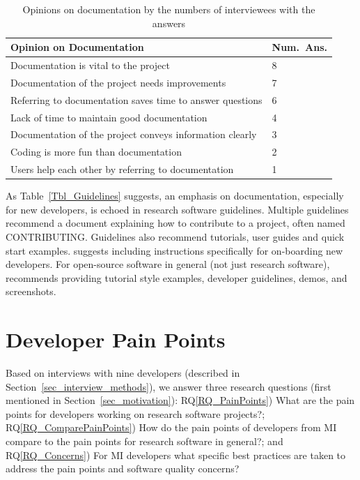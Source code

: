 \documentclass[final, 12pt, 3p, times]{elsarticle}
\newcommand{\rqref}[1]{RQ\ref{#1}}
\begin{document}
\begin{table}[!ht]
\centering
\begin{tabular}{ll}
\toprule
Opinion on Documentation & Num.\ Ans. \\ 
\midrule
Documentation is vital to the project & 8 \\
Documentation of the project needs improvements & 7 \\
Referring to documentation saves time to answer questions & 6 \\
Lack of time to maintain good documentation & 4 \\
Documentation of the project conveys information clearly & 3 \\
Coding is more fun than documentation & 2 \\
Users help each other by referring to documentation & 1 \\ 
\bottomrule
\end{tabular}
\caption{Opinions on documentation by the numbers of interviewees with the
answers}
\label{tab_opinion_doc}
\end{table}

As Table~\ref{Tbl_Guidelines} suggests, an emphasis on documentation, especially
for new developers, is echoed in research software guidelines. Multiple
guidelines recommend a document explaining how to contribute to a project, often
named CONTRIBUTING. Guidelines also recommend tutorials, user guides and quick
start examples. \cite{SmithAndRoscoe2018} suggests including instructions
specifically for on-boarding new developers. For open-source software in general
(not just research software), \cite{Fogel2005} recommends providing tutorial
style examples, developer guidelines, demos, and screenshots.

\section{Developer Pain Points} \label{painpoints}

Based on interviews with nine developers (described in
Section~\ref{sec_interview_methods}), we answer three research questions (first
mentioned in Section~\ref{sec_motivation}): \rqref{RQ_PainPoints}) What are the
pain points for developers working on research software projects?;
\rqref{RQ_ComparePainPoints}) How do the pain points of developers from MI
compare to the pain points for research software in general?; and
\rqref{RQ_Concerns}) For MI developers what specific best practices are taken to
address the pain points and software quality concerns? 
\end{document}
